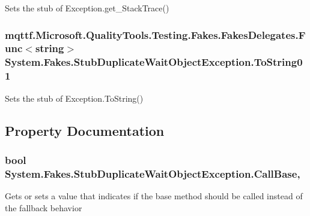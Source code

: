 Sets the stub of Exception.\-get\-\_\-\-Stack\-Trace()

\hypertarget{class_system_1_1_fakes_1_1_stub_duplicate_wait_object_exception_ad086edbd35fd6d4ee98171001242e852}{
\subsubsection[{To\-String01}]{\setlength{\rightskip}{0pt plus 5cm}mqttf.\-Microsoft.\-Quality\-Tools.\-Testing.\-Fakes.\-Fakes\-Delegates.\-Func$<$string$>$ System.\-Fakes.\-Stub\-Duplicate\-Wait\-Object\-Exception.\-To\-String01}}\label{class_system_1_1_fakes_1_1_stub_duplicate_wait_object_exception_ad086edbd35fd6d4ee98171001242e852}


Sets the stub of Exception.\-To\-String()



\subsection{Property Documentation}
\hypertarget{class_system_1_1_fakes_1_1_stub_duplicate_wait_object_exception_aaddc65278758dfbb69cededfa1ce5012}{
\subsubsection[{Call\-Base}]{\setlength{\rightskip}{0pt plus 5cm}bool System.\-Fakes.\-Stub\-Duplicate\-Wait\-Object\-Exception.\-Call\-Base\hspace{0.3cm}{\ttfamily [get]}, {\ttfamily [set]}}}\label{class_system_1_1_fakes_1_1_stub_duplicate_wait_object_exception_aaddc65278758dfbb69cededfa1ce5012}


Gets or sets a value that indicates if the base method should be called instead of the fallback behavior

